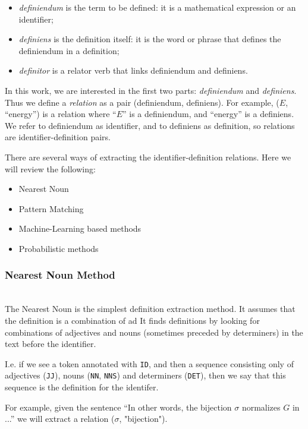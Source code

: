 \begin{itemize}
\itemsep1pt\parskip0pt
  \item \emph{definiendum} is the term to be defined: it is a mathematical expression
      or an identifier;
  \item \emph{definiens} is the definition itself: it is the word or phrase that defines the definiendum in a definition;
  \item \emph{definitor} is a relator verb that links definiendum and definiens.
\end{itemize}

In this work, we are interested in the first two parts: \emph{definiendum} and
\emph{definiens}. Thus we define a \emph{relation} as a pair
(definiendum, definiens). For example, ($E$, ``energy'') is a relation where
``$E$'' is a definiendum, and ``energy'' is a definiens. We refer to definiendum as
identifier, and to definiens as definition, so relations are identifier-definition
pairs.

There are several ways of extracting the identifier-definition relations.
Here we will review the following:

\begin{itemize}
\itemsep1pt\parskip0pt
  \item Nearest Noun
  \item Pattern Matching
  \item Machine-Learning based methods
  \item Probabilistic methods
\end{itemize}


\subsubsection{Nearest Noun Method} \ \\

The Nearest Noun  \cite{grigore2009towards} \cite{yokoi2011contextual}
is the simplest definition extraction method.
It assumes that the definition is a combination of ad
It finds definitions by looking for combinations of adjectives and nouns
(sometimes preceded by determiners) in the text before the identifier.

I.e. if we see a token annotated with \texttt{ID}, and then a sequence
consisting only of adjectives (\texttt{JJ}), nouns (\texttt{NN}, \texttt{NNS})
and determiners (\texttt{DET}), then we say that this sequence is
the definition for the identifer.

For example, given the sentence ``In other words, the bijection $\sigma$ normalizes
$G$ in ...'' we will extract a relation ($\sigma$, "bijection").




